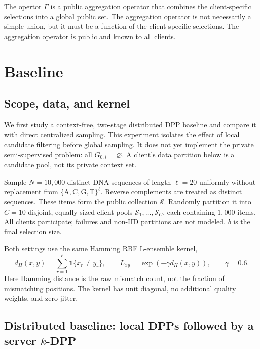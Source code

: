 \documentclass[11pt]{article}
\begin{document}
The opertor $\Gamma$ is a public aggregation operator that combines the client-specific selections into a global public set. The aggregation operator is not
necessarily a simple union, but it must be a function of the client-specific selections. The aggregation operator is public and known to all clients.

\section{Baseline}

\subsection{Scope, data, and kernel}

We first study a context-free, two-stage distributed DPP baseline and compare
it with direct centralized sampling. This experiment isolates the effect of
local candidate filtering before global sampling. It does not yet implement
the private semi-supervised problem: all $G_{0,i}=\varnothing$. A client's data partition below is a
candidate pool, not its private context set.

Sample $N=10{,}000$ distinct DNA sequences of length $\ell=20$ uniformly
without replacement from $\{\mathrm{A},\mathrm{C},\mathrm{G},\mathrm{T}\}^{\ell}$.
Reverse complements are treated as distinct
sequences. These items form the public collection $\mathcal{S}$. Randomly
partition it into $C=10$ disjoint, equally sized client pools
$\mathcal{S}_1,\ldots,\mathcal{S}_C$, each containing $1{,}000$ items.
All clients participate; failures and non-IID partitions are not modeled.
$b$ is the final selection size.

Both settings use the same Hamming RBF L-ensemble kernel,
\begin{equation}
  d_H(x,y)=\sum_{r=1}^{\ell}\mathbf{1}\{x_r\ne y_r\},
  \qquad
  L_{xy}=\exp\!\left(-\gamma d_H(x,y)\right),
  \qquad \gamma=0.6.
  \label{eq:baseline-kernel}
\end{equation}
Here Hamming distance is the raw mismatch count, not the fraction of
mismatching positions. The kernel has unit diagonal, no additional quality
weights, and zero jitter. 

\subsection{Distributed baseline: local DPPs followed by a server $k$-DPP}
\end{document}
